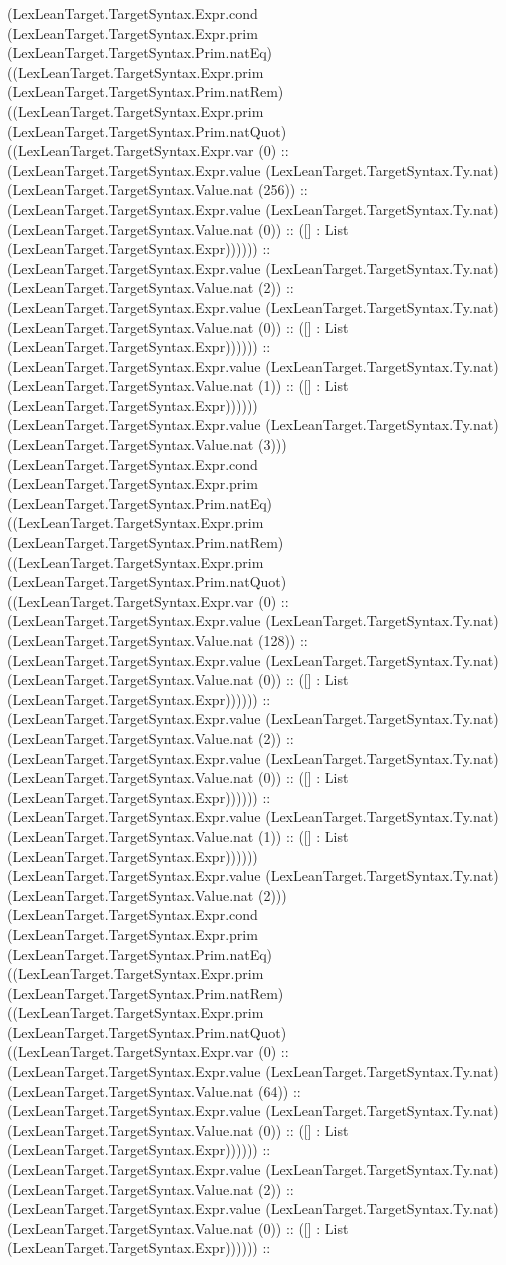 \documentclass[11pt]{article}
\begin{document}
(LexLeanTarget.TargetSyntax.Expr.cond (LexLeanTarget.TargetSyntax.Expr.prim (LexLeanTarget.TargetSyntax.Prim.natEq) ((LexLeanTarget.TargetSyntax.Expr.prim (LexLeanTarget.TargetSyntax.Prim.natRem) ((LexLeanTarget.TargetSyntax.Expr.prim (LexLeanTarget.TargetSyntax.Prim.natQuot) ((LexLeanTarget.TargetSyntax.Expr.var (0) :: (LexLeanTarget.TargetSyntax.Expr.value (LexLeanTarget.TargetSyntax.Ty.nat) (LexLeanTarget.TargetSyntax.Value.nat (256)) :: (LexLeanTarget.TargetSyntax.Expr.value (LexLeanTarget.TargetSyntax.Ty.nat) (LexLeanTarget.TargetSyntax.Value.nat (0)) :: ([] : List (LexLeanTarget.TargetSyntax.Expr)))))) :: (LexLeanTarget.TargetSyntax.Expr.value (LexLeanTarget.TargetSyntax.Ty.nat) (LexLeanTarget.TargetSyntax.Value.nat (2)) :: (LexLeanTarget.TargetSyntax.Expr.value (LexLeanTarget.TargetSyntax.Ty.nat) (LexLeanTarget.TargetSyntax.Value.nat (0)) :: ([] : List (LexLeanTarget.TargetSyntax.Expr)))))) :: (LexLeanTarget.TargetSyntax.Expr.value (LexLeanTarget.TargetSyntax.Ty.nat) (LexLeanTarget.TargetSyntax.Value.nat (1)) :: ([] : List (LexLeanTarget.TargetSyntax.Expr)))))) (LexLeanTarget.TargetSyntax.Expr.value (LexLeanTarget.TargetSyntax.Ty.nat) (LexLeanTarget.TargetSyntax.Value.nat (3))) (LexLeanTarget.TargetSyntax.Expr.cond (LexLeanTarget.TargetSyntax.Expr.prim (LexLeanTarget.TargetSyntax.Prim.natEq) ((LexLeanTarget.TargetSyntax.Expr.prim (LexLeanTarget.TargetSyntax.Prim.natRem) ((LexLeanTarget.TargetSyntax.Expr.prim (LexLeanTarget.TargetSyntax.Prim.natQuot) ((LexLeanTarget.TargetSyntax.Expr.var (0) :: (LexLeanTarget.TargetSyntax.Expr.value (LexLeanTarget.TargetSyntax.Ty.nat) (LexLeanTarget.TargetSyntax.Value.nat (128)) :: (LexLeanTarget.TargetSyntax.Expr.value (LexLeanTarget.TargetSyntax.Ty.nat) (LexLeanTarget.TargetSyntax.Value.nat (0)) :: ([] : List (LexLeanTarget.TargetSyntax.Expr)))))) :: (LexLeanTarget.TargetSyntax.Expr.value (LexLeanTarget.TargetSyntax.Ty.nat) (LexLeanTarget.TargetSyntax.Value.nat (2)) :: (LexLeanTarget.TargetSyntax.Expr.value (LexLeanTarget.TargetSyntax.Ty.nat) (LexLeanTarget.TargetSyntax.Value.nat (0)) :: ([] : List (LexLeanTarget.TargetSyntax.Expr)))))) :: (LexLeanTarget.TargetSyntax.Expr.value (LexLeanTarget.TargetSyntax.Ty.nat) (LexLeanTarget.TargetSyntax.Value.nat (1)) :: ([] : List (LexLeanTarget.TargetSyntax.Expr)))))) (LexLeanTarget.TargetSyntax.Expr.value (LexLeanTarget.TargetSyntax.Ty.nat) (LexLeanTarget.TargetSyntax.Value.nat (2))) (LexLeanTarget.TargetSyntax.Expr.cond (LexLeanTarget.TargetSyntax.Expr.prim (LexLeanTarget.TargetSyntax.Prim.natEq) ((LexLeanTarget.TargetSyntax.Expr.prim (LexLeanTarget.TargetSyntax.Prim.natRem) ((LexLeanTarget.TargetSyntax.Expr.prim (LexLeanTarget.TargetSyntax.Prim.natQuot) ((LexLeanTarget.TargetSyntax.Expr.var (0) :: (LexLeanTarget.TargetSyntax.Expr.value (LexLeanTarget.TargetSyntax.Ty.nat) (LexLeanTarget.TargetSyntax.Value.nat (64)) :: (LexLeanTarget.TargetSyntax.Expr.value (LexLeanTarget.TargetSyntax.Ty.nat) (LexLeanTarget.TargetSyntax.Value.nat (0)) :: ([] : List (LexLeanTarget.TargetSyntax.Expr)))))) :: (LexLeanTarget.TargetSyntax.Expr.value (LexLeanTarget.TargetSyntax.Ty.nat) (LexLeanTarget.TargetSyntax.Value.nat (2)) :: (LexLeanTarget.TargetSyntax.Expr.value (LexLeanTarget.TargetSyntax.Ty.nat) (LexLeanTarget.TargetSyntax.Value.nat (0)) :: ([] : List (LexLeanTarget.TargetSyntax.Expr)))))) :: 
\end{document}
